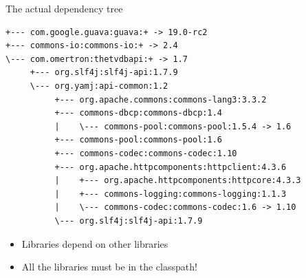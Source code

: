 \documentclass[presentation]{beamer}
\begin{document}
\begin{frame}[fragile]{The actual dependency tree}
  \begin{block}{}
    \begin{verbatim}
+--- com.google.guava:guava:+ -> 19.0-rc2
+--- commons-io:commons-io:+ -> 2.4
\--- com.omertron:thetvdbapi:+ -> 1.7
     +--- org.slf4j:slf4j-api:1.7.9
     \--- org.yamj:api-common:1.2
          +--- org.apache.commons:commons-lang3:3.3.2
          +--- commons-dbcp:commons-dbcp:1.4
          |    \--- commons-pool:commons-pool:1.5.4 -> 1.6
          +--- commons-pool:commons-pool:1.6
          +--- commons-codec:commons-codec:1.10
          +--- org.apache.httpcomponents:httpclient:4.3.6
          |    +--- org.apache.httpcomponents:httpcore:4.3.3
          |    +--- commons-logging:commons-logging:1.1.3
          |    \--- commons-codec:commons-codec:1.6 -> 1.10
          \--- org.slf4j:slf4j-api:1.7.9
    \end{verbatim}
  \end{block}
  \begin{itemize}
   \item Libraries depend on other libraries
   \item All the libraries must be in the classpath!
  \end{itemize}
\end{frame}
\end{document}

